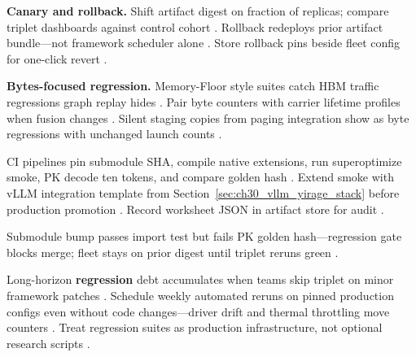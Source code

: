 \textbf{Canary and rollback.} Shift artifact digest on fraction of replicas; compare triplet dashboards against control cohort \citep{patel2025llminference,yirage2026,chen2020compilerbasedhardw,kwon2023vllm,taxbreak2026,memoryfloor2026,dlbook}. Rollback redeploys prior artifact bundle---not framework scheduler alone \citep{yirage2026,chen2020compilerbasedhardw,patel2025llminference,kwon2023vllm,dlbook}. Store rollback pins beside fleet config for one-click revert \citep{patel2025llminference,yirage2026,chen2020compilerbasedhardw,dlbook}.

\textbf{Bytes-focused regression.} Memory-Floor style suites catch HBM traffic regressions graph replay hides \citep{memoryfloor2026,nvidia2024cudagraphs,patel2025llminference,yirage2026,chen2020compilerbasedhardw,dao2022flashattention,dlbook}. Pair byte counters with carrier lifetime profiles when fusion changes \citep{memoryfloor2026,yirage2026,chen2020compilerbasedhardw,patel2025llminference,dao2022flashattention,dlbook}. Silent staging copies from paging integration show as byte regressions with unchanged launch counts \citep{memoryfloor2026,kwon2023vllm,yirage2026,chen2020compilerbasedhardw,patel2025llminference,taxbreak2026,dlbook}.

CI pipelines pin submodule SHA, compile native extensions, run superoptimize smoke, PK decode ten tokens, and compare golden hash \citep{yirage2026,chen2020compilerbasedhardw,patel2025llminference,kwon2023vllm,taxbreak2026,memoryfloor2026,nvidia2024cudagraphs,dao2022flashattention,liu2024deepseekv3,semianalysis2024tma,amd2024xdna,amd2024aie,dao2023flashdecoding,nvidia2022hopper,dlbook}. Extend smoke with vLLM integration template from Section~\ref{sec:ch30_vllm_yirage_stack} before production promotion \citep{kwon2023vllm,yirage2026,chen2020compilerbasedhardw,patel2025llminference,dlbook}. Record worksheet JSON in artifact store for audit \citep{yirage2026,chen2020compilerbasedhardw,patel2025llminference,dlbook}.

\begin{example}
Submodule bump passes import test but fails PK golden hash---regression gate blocks merge; fleet stays on prior digest until triplet reruns green \citep{yirage2026,chen2020compilerbasedhardw,patel2025llminference,taxbreak2026,memoryfloor2026,kwon2023vllm,dlbook}.
\end{example}

Long-horizon \textbf{regression} debt accumulates when teams skip triplet on minor framework patches \citep{patel2025llminference,yirage2026,chen2020compilerbasedhardw,kwon2023vllm,dlbook}. Schedule weekly automated reruns on pinned production configs even without code changes---driver drift and thermal throttling move counters \citep{patel2025llminference,yirage2026,chen2020compilerbasedhardw,semianalysis2024tma,dlbook,taxbreak2026,memoryfloor2026,kwon2023vllm,liu2024deepseekv3,nvidia2024cudagraphs,dao2022flashattention,amd2024aie,amd2024xdna,dao2023flashdecoding,nvidia2022hopper,dlbook}. Treat regression suites as production infrastructure, not optional research scripts \citep{patel2025llminference,yirage2026,chen2020compilerbasedhardw,dlbook}.

